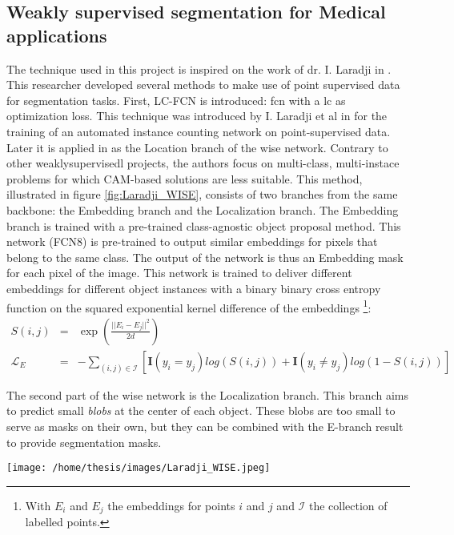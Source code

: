 \subsection{Weakly supervised segmentation for Medical applications}
\par{
    The technique used in this project is inspired on the work of dr. I. Laradji in \cite{Laradji2020}.
    This researcher developed several methods to make use of point supervised data for segmentation tasks.
    First, LC-FCN is introduced: \acrfull{fcn} with a \acrfull{lc} as optimization loss.
    This technique was introduced by I. Laradji et al in \cite{Laradji2018} for the training of an automated instance counting network on point-supervised data.
    Later it is applied in \cite{Laradji2020} as the Location branch of the \Gls{wise} network.
    Contrary to other \Gls{weaklysupervisedl} projects, the authors focus on multi-class, multi-instace problems for which CAM-based solutions are less suitable.
    This method, illustrated in figure \ref{fig:Laradji_WISE}, consists of two branches from the same backbone: the Embedding branch and the Localization branch.
    The Embedding branch is trained with a pre-trained class-agnostic object proposal method. 
    This network (FCN8) is pre-trained to output similar embeddings for pixels that belong to the same class.
    The output of the network is thus an Embedding mask for each pixel of the image. 
    This network is trained to deliver different embeddings for different object instances with a binary binary cross entropy function on the squared exponential kernel difference of the embeddings
    \footnote{With $E_i$ and $E_j$ the embeddings for points $i$ and $j$ and $\mathcal{I}$ the collection of labelled points.}:
}
\begin{eqnarray}
    S(i,j) &=& \exp \left( \frac{||E_i-E_j||^2}{2d} \right)\\
    \mathcal{L}_E &=& - \sum_{(i,j)\in \mathcal{I}} \left[  \mathbf{I}(y_i=y_j) log(S(i,j)) + \mathbf{I}(y_i\neq y_j) log(1-S(i,j))  \right]
\end{eqnarray}
\par{
    The second part of the \Gls{wise} network is the Localization branch. 
    This branch aims to predict small \textit{blobs} at the center of each object.
    These blobs are too small to serve as masks on their own, but they can be combined with the E-branch result to provide segmentation masks.
}
\begin{SCfigure}[][htb]
    \texttt{[image: /home/thesis/images/Laradji\_WISE.jpeg]}
    \caption{Illustration from \cite{Laradji2020}. The \Gls{wise} approach consists of two branches: The Embedding branch and the Localization branch.}
    \label{fig:Laradji_WISE}
\end{SCfigure}
